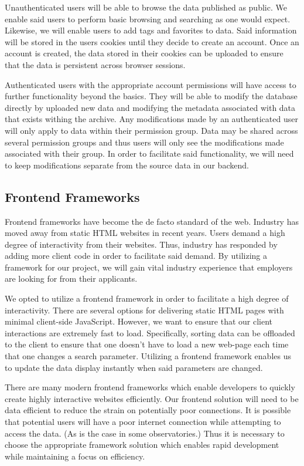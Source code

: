 \documentclass[12pt]{article}
\begin{document}
Unauthenticated users will be able to browse the data published as public. We enable said users to perform basic browsing and searching as one would expect. Likewise, we will enable users to add tags and favorites to data. Said information will be stored in the users cookies until they decide to create an account. Once an account is created, the data stored in their cookies can be uploaded to ensure that the data is persistent across browser sessions.

Authenticated users with the appropriate account permissions will have access to further functionality beyond the basics. They will be able to modify the database directly by uploaded new data and modifying the metadata associated with data that exists withing the archive. Any modifications made by an authenticated user will only apply to data within their permission group. Data may be shared across several permission groups and thus users will only see the modifications made associated with their group. In order to facilitate said functionality, we will need to keep modifications separate from the source data in our backend.

\subsection{Frontend Frameworks}

Frontend frameworks have become the de facto standard of the web. Industry has moved away from static HTML websites in recent years. Users demand a high degree of interactivity from their websites. Thus, industry has responded by adding more client code in order to facilitate said demand. By utilizing a framework for our project, we will gain vital industry experience that employers are looking for from their applicants.

We opted to utilize a frontend framework in order to facilitate a high degree of interactivity. There are several options for delivering static HTML pages with minimal client-side JavaScript. However, we want to ensure that our client interactions are extremely fast to load. Specifically, sorting data can be offloaded to the client to ensure that one doesn't have to load a new web-page each time that one changes a search parameter. Utilizing a frontend framework enables us to update the data display instantly when said parameters are changed.

There are many modern frontend frameworks which enable developers to quickly create highly interactive websites efficiently. Our frontend solution will need to be data efficient to reduce the strain on potentially poor connections. It is possible that potential users will have a poor internet connection while attempting to access the data. (As is the case in some observatories.) Thus it is necessary to choose the appropriate framework solution which enables rapid development while maintaining a focus on efficiency.
\end{document}
